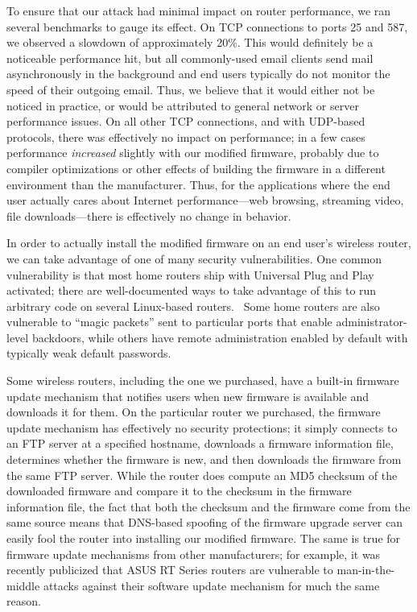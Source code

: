 \documentclass{article}
\begin{document}
To ensure that our attack had minimal impact on router performance, we
ran several benchmarks to gauge its effect. On TCP connections to
ports 25 and 587, we observed a slowdown of approximately 20\%. This
would definitely be a noticeable performance hit, but all
commonly-used email clients send mail asynchronously in the background
and end users typically do not monitor the speed of their outgoing
email. Thus, we believe that it would either not be noticed in
practice, or would be attributed to general network or server
performance issues. On all other TCP connections, and with UDP-based
protocols, there was effectively no impact on performance; in a few
cases performance \emph{increased} slightly with our modified
firmware, probably due to compiler optimizations or other effects of
building the firmware in a different environment than the
manufacturer. Thus, for the applications where the end user actually
cares about Internet performance---web browsing, streaming video, file
downloads---there is effectively no change in behavior.

In order to actually install the modified firmware on an end user's
wireless router, we can take advantage of one of many security
vulnerabilities. One common vulnerability is that most home routers
ship with Universal Plug and Play activated; there are well-documented
ways to take advantage of this to run arbitrary code on several
Linux-based routers.~\cite{UPnP} Some home routers are also vulnerable
to ``magic packets'' sent to particular ports that enable
administrator-level backdoors, while others have remote administration
enabled by default with typically weak default passwords.

Some wireless routers, including the one we purchased, have a built-in
firmware update mechanism that notifies users when new firmware is
available and downloads it for them. On the particular router we
purchased, the firmware update mechanism has effectively no security
protections; it simply connects to an FTP server at a specified
hostname, downloads a firmware information file, determines whether
the firmware is new, and then downloads the firmware from the same FTP
server. While the router does compute an MD5 checksum of the
downloaded firmware and compare it to the checksum in the firmware
information file, the fact that both the checksum and the firmware
come from the same source means that DNS-based spoofing of the
firmware upgrade server can easily fool the router into installing our
modified firmware. The same is true for firmware update mechanisms
from other manufacturers; for example, it was recently publicized that
ASUS RT Series routers are vulnerable to man-in-the-middle attacks
against their software update mechanism for much the same
reason.~\cite{AsusMITM}
\end{document}
